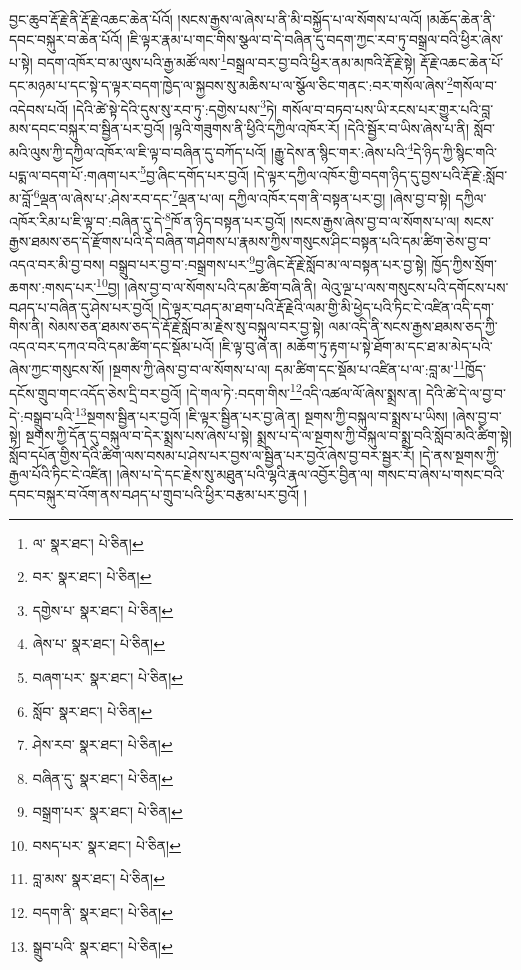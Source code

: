 བྱང་ཆུབ་རྡོ་རྗེ་ནི་རྡོ་རྗེ་འཆང་ཆེན་པོའོ། །སངས་རྒྱས་ལ་ཞེས་པ་ནི་མི་བསྐྱོད་པ་ལ་སོགས་པ་ལའོ། །མཆོད་ཆེན་ནི་དབང་བསྐུར་བ་ཆེན་པོའོ། །ཇི་ལྟར་རྣམ་པ་གང་གིས་སྩལ་བ་དེ་བཞིན་དུ་བདག་ཀྱང་རབ་ཏུ་བསྒྲལ་བའི་ཕྱིར་ཞེས་པ་སྟེ། བདག་འཁོར་བ་མ་ལུས་པའི་རྒྱ་མཚོ་ལས་\footnote{ལ་  སྣར་ཐང་།  པེ་ཅིན། }བསྒྲལ་བར་བྱ་བའི་ཕྱིར་ནམ་མཁའི་རྡོ་རྗེ་སྟེ། རྡོ་རྗེ་འཆང་ཆེན་པོ་དང་མཉམ་པ་དང་སྟེ་ད་ལྟར་བདག་ཁྱེད་ལ་སྐྱབས་སུ་མཆིས་པ་ལ་སྩོལ་ཅིང་གནང་:བར་གསོལ་ཞེས་\footnote{བར་  སྣར་ཐང་།  པེ་ཅིན། }གསོལ་བ་འདེབས་པའོ། །དེའི་ཚེ་སྟེ་དེའི་དུས་སུ་རབ་ཏུ་:དགྱེས་པས་\footnote{དགྱེས་པ་  སྣར་ཐང་།  པེ་ཅིན། }ཏེ། གསོལ་བ་བཏབ་པས་ཡི་རངས་པར་གྱུར་པའི་བླ་མས་དབང་བསྐུར་བ་སྦྱིན་པར་བྱའོ། །ལྷའི་གཟུགས་ནི་ཕྱིའི་དཀྱིལ་འཁོར་རོ། །དེའི་སྦྱོར་བ་ཡིས་ཞེས་པ་ནི། སློབ་མའི་ལུས་ཀྱི་དཀྱིལ་འཁོར་ལ་ཇི་ལྟ་བ་བཞིན་དུ་བཀོད་པའོ། །རྒྱུ་དེས་ན་སྙིང་གར་:ཞེས་པའི་\footnote{ཞེས་པ་  སྣར་ཐང་།  པེ་ཅིན། }དེ་ཉིད་ཀྱི་སྙིང་གའི་པདྨ་ལ་བདག་པོ་:གཞག་པར་\footnote{བཞག་པར་  སྣར་ཐང་།  པེ་ཅིན། }བྱ་ཞིང་དགོད་པར་བྱའོ། །དེ་ལྟར་དཀྱིལ་འཁོར་གྱི་བདག་ཉིད་དུ་བྱས་པའི་རྡོ་རྗེ་:སློབ་མ་བློ་\footnote{སློབ་  སྣར་ཐང་།  པེ་ཅིན། }ལྡན་ལ་ཞེས་པ་:ཤེས་རབ་དང་\footnote{ཤེས་རབ་  སྣར་ཐང་།  པེ་ཅིན། }ལྡན་པ་ལ། དཀྱིལ་འཁོར་དག་ནི་བསྟན་པར་བྱ། །ཞེས་བྱ་བ་སྟེ། དཀྱིལ་འཁོར་རིམ་པ་ཇི་ལྟ་བ་:བཞིན་དུ་དེ་\footnote{བཞིན་དུ་  སྣར་ཐང་།  པེ་ཅིན། }ཁོ་ན་ཉིད་བསྟན་པར་བྱའོ། །སངས་རྒྱས་ཞེས་བྱ་བ་ལ་སོགས་པ་ལ། སངས་རྒྱས་ཐམས་ཅད་དེ་རྫོགས་པའི་དེ་བཞིན་གཤེགས་པ་རྣམས་ཀྱིས་གསུངས་ཤིང་བསྟན་པའི་དམ་ཚིག་ཅེས་བྱ་བ་འདའ་བར་མི་བྱ་བས། བསྒྲུབ་པར་བྱ་བ་:བསྒྲགས་པར་\footnote{བསྒྲག་པར་  སྣར་ཐང་།  པེ་ཅིན། }བྱ་ཞིང་རྡོ་རྗེ་སློབ་མ་ལ་བསྟན་པར་བྱ་སྟེ། ཁྱོད་ཀྱིས་སྲོག་ཆགས་:གསད་པར་\footnote{བསད་པར་  སྣར་ཐང་།  པེ་ཅིན། }བྱ། །ཞེས་བྱ་བ་ལ་སོགས་པའི་དམ་ཚིག་བཞི་ནི། ལེའུ་ལྔ་པ་ལས་གསུངས་པའི་དགོངས་པས་བཤད་པ་བཞིན་དུ་ཤེས་པར་བྱའོ། །དེ་ལྟར་བཤད་མ་ཐག་པའི་རྡོ་རྗེའི་ལམ་གྱི་མི་ཕྱེད་པའི་ཏིང་ངེ་འཛིན་འདི་དག་གིས་ནི། སེམས་ཅན་ཐམས་ཅད་དེ་རྡོ་རྗེ་སློབ་མ་རྗེས་སུ་བསྐུལ་བར་བྱ་སྟེ། ལམ་འདི་ནི་སངས་རྒྱས་ཐམས་ཅད་ཀྱི་འདའ་བར་དཀའ་བའི་དམ་ཚིག་དང་སྡོམ་པའོ། །ཇི་ལྟ་བུ་ཞེ་ན། མཆོག་ཏུ་རྟག་པ་སྟེ་ཐོག་མ་དང་ཐ་མ་མེད་པའི་ཞེས་ཀྱང་གསུངས་སོ། །སྔགས་ཀྱི་ཞེས་བྱ་བ་ལ་སོགས་པ་ལ། དམ་ཚིག་དང་སྡོམ་པ་འཛིན་པ་ལ་:བླ་མ་\footnote{བླ་མས་  སྣར་ཐང་།  པེ་ཅིན། }ཁྱོད་དངོས་གྲུབ་གང་འདོད་ཅེས་དྲི་བར་བྱའོ། །དེ་གལ་ཏེ་:བདག་གིས་\footnote{བདག་ནི་  སྣར་ཐང་།  པེ་ཅིན། }འདི་འཚལ་ལོ་ཞེས་སྨྲས་ན། དེའི་ཚེ་དེ་ལ་བྱ་བ་དེ་:བསྒྲུབ་པའི་\footnote{སྒྲུབ་པའི་  སྣར་ཐང་།  པེ་ཅིན། }སྔགས་སྦྱིན་པར་བྱའོ། །ཇི་ལྟར་སྦྱིན་པར་བྱ་ཞེ་ན། སྔགས་ཀྱི་བསྐུལ་བ་སྨྲས་པ་ཡིས། །ཞེས་བྱ་བ་སྟེ། སྔགས་ཀྱི་དོན་དུ་བསྐུལ་བ་དེར་སྨྲས་པས་ཞེས་པ་སྟེ། སྨྲས་པ་དེ་ལ་སྔགས་ཀྱི་བསྐུལ་བ་སྨྲ་བའི་སློབ་མའི་ཚིག་སྟེ། སློབ་དཔོན་གྱིས་དེའི་ཚིག་ལས་བསམ་པ་ཤེས་པར་བྱས་ལ་སྦྱིན་པར་བྱའོ་ཞེས་བྱ་བར་སྦྱར་རོ། །དེ་ནས་སྔགས་ཀྱི་རྒྱལ་པོའི་ཏིང་ངེ་འཛིན། །ཞེས་པ་དེ་དང་རྗེས་སུ་མཐུན་པའི་ལྷའི་རྣལ་འབྱོར་བྱིན་ལ། གསང་བ་ཞེས་པ་གསང་བའི་དབང་བསྐུར་བ་འོག་ནས་བཤད་པ་གྲུབ་པའི་ཕྱིར་བརྩམ་པར་བྱའོ། །

